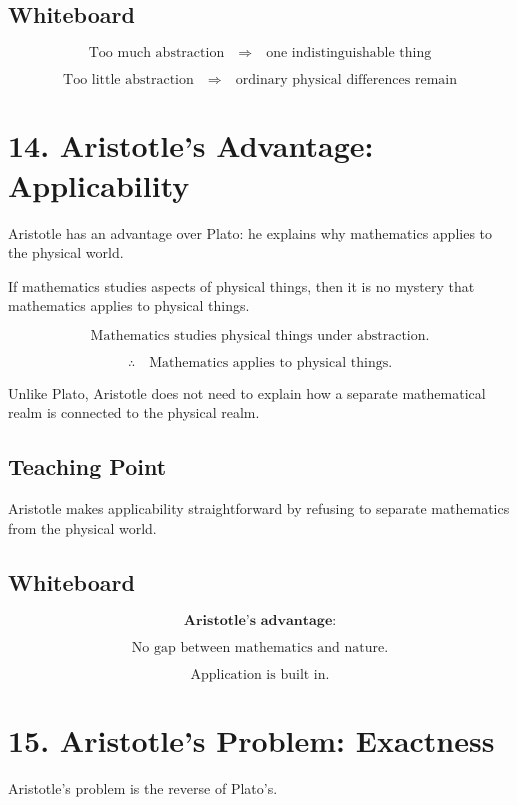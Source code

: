 \documentclass[11pt]{article}
\begin{document}
\subsection*{Whiteboard}

\[
\text{Too much abstraction}
\quad \Rightarrow \quad
\text{one indistinguishable thing}
\]

\[
\text{Too little abstraction}
\quad \Rightarrow \quad
\text{ordinary physical differences remain}
\]

\section*{14. Aristotle's Advantage: Applicability}

Aristotle has an advantage over Plato: he explains why mathematics applies to the physical
world.

If mathematics studies aspects of physical things, then it is no mystery that mathematics
applies to physical things.

\[
\text{Mathematics studies physical things under abstraction.}
\]

\[
\therefore
\quad
\text{Mathematics applies to physical things.}
\]

Unlike Plato, Aristotle does not need to explain how a separate mathematical realm is
connected to the physical realm.

\subsection*{Teaching Point}

Aristotle makes applicability straightforward by refusing to separate mathematics from the
physical world.

\subsection*{Whiteboard}

\[
\textbf{Aristotle's advantage:}
\]

\[
\text{No gap between mathematics and nature.}
\]

\[
\text{Application is built in.}
\]

\section*{15. Aristotle's Problem: Exactness}

Aristotle's problem is the reverse of Plato's.
\end{document}
